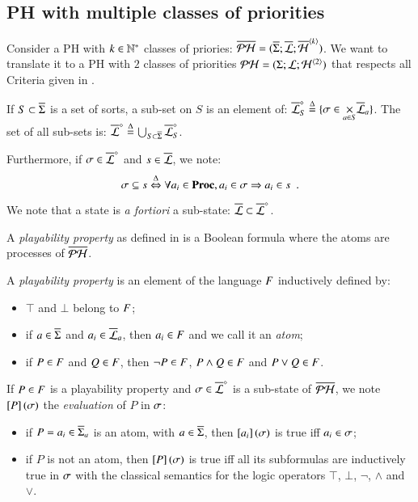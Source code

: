\subsection{PH with multiple classes of priorities}
\label{ssec:flattening}

Consider a PH with $k \in \mathbb{N}^*$ classes of priories:
$\overline{\mathcal{PH}} = (\overline{\Sigma}; \overline{\mathcal{L}}; \overline{\mathcal{H}}^{{\langle k \rangle}})$.
We want to translate it to a PH with $2$ classes of priorities
$\mathcal{PH} = (\Sigma; \mathcal{L}; \mathcal{H}^{{\langle 2 \rangle}})$
that respects all Criteria given in .


\begin{definition}
  If $S \subset \overline{\Sigma}$ is a set of sorts, a sub-set on $S$ is an element of:
  $\overline{\mathcal{L}}^\diamond_S \stackrel{\Delta}= \{ \sigma \in \underset{a \in S}{\times} \overline{\mathcal{L}}_a \}$.
  The set of all sub-sets is:
  $\overline{\mathcal{L}}^\diamond \stackrel{\Delta}= \bigcup_{S \subset \overline{\Sigma}} \overline{\mathcal{L}}^\diamond_S$.
  
  \noindent
  Furthermore, if $\sigma \in \overline{\mathcal{L}}^\diamond$ and $s \in \overline{\mathcal{L}}$, we note:
    \[\sigma \subseteq s \stackrel{\Delta}\Leftrightarrow \forall a_i \in \mathbf{Proc}, a_i \in \sigma \Rightarrow a_i \in s \enspace.\]
\end{definition}

We note that a state is \textit{a fortiori} a sub-state: $\overline{\mathcal{L}} \subset \overline{\mathcal{L}}^\diamond$.

A \emph{playability property} as defined in  is a Boolean formula where the atoms are processes of $\overline{\mathcal{PH}}$.

\begin{definition}
  \label{def:pp}
  A \emph{playability property} is an element of the language $F$ inductively defined by:
  \begin{itemize}
    \item $\top$ and $\bot$ belong to $F$;
    \item if $a \in \overline{\Sigma}$ and $a_i \in \overline{\mathcal{L}}_a$, then $a_i \in F$ and we call it an \emph{atom};
    \item if $P \in F$ and $Q \in F$, then $\neg P \in F$, $P \wedge Q \in F$ and $P \vee Q \in F$.
  \end{itemize}
  If $P \in F$ is a playability property and $\sigma \in \overline{\mathcal{L}}^\diamond$ is a sub-state of $\overline{\mathcal{PH}}$,
  we note $\left[P\right](\sigma)$ the \emph{evaluation} of $P$ in $\sigma$:
  \begin{itemize}
    \item if $P = a_i \in \overline{\Sigma}_a$ is an atom, with $a \in \overline{\Sigma}$, then $\left[a_i\right](\sigma)$ is true iff $a_i \in \sigma$;
    \item if $P$ is not an atom, then $\left[P\right](\sigma)$ is true iff all its subformulas are inductively true in $\sigma$
      with the classical semantics for the logic operators $\top$, $\bot$, $\neg$, $\wedge$ and $\vee$.
  \end{itemize}
\end{definition}

